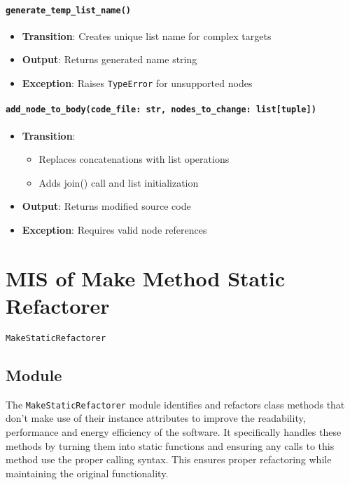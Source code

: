 \documentclass[12pt, titlepage]{article}
\begin{document}
  \paragraph{\texttt{generate\_temp\_list\_name()}}
  \begin{itemize}
  \item \textbf{Transition}: Creates unique list name for complex targets
  \item \textbf{Output}: Returns generated name string
  \item \textbf{Exception}: Raises \texttt{TypeError} for unsupported nodes
  \end{itemize}
  
  \paragraph{\texttt{add\_node\_to\_body(code\_file: str, nodes\_to\_change: list[tuple])}}
  \begin{itemize}
  \item \textbf{Transition}:
  \begin{itemize}
  \item Replaces concatenations with list operations
  \item Adds join() call and list initialization
  \end{itemize}
  \item \textbf{Output}: Returns modified source code
  \item \textbf{Exception}: Requires valid node references
  \end{itemize}

  
\newpage

\section{MIS of Make Method Static Refactorer} \label{mis:MakeStatic}

\texttt{MakeStaticRefactorer}

\subsection{Module}

The \texttt{MakeStaticRefactorer} module identifies and refactors 
class methods that don't make use of their instance attributes to improve the readability, performance and energy efficiency of the software. It specifically handles these methods by turning them into static functions and ensuring any calls to this method use the proper calling syntax. This ensures proper refactoring while maintaining the original functionality.
\end{document}
